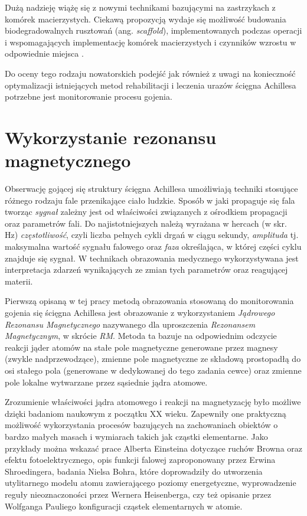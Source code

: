 Dużą nadzieję wiążę się z nowymi technikami bazującymi na zastrzykach z komórek macierzystych. Ciekawą propozycją wydaje się możliwość budowania biodegradowalnych rusztowań (ang. \textit{scaffold}), implementowanych podczas operacji i wspomagających implementację komórek macierzystych i czynników wzrostu w odpowiednie miejsca \cite{START}.

Do oceny tego rodzaju nowatorskich podejść jak również z uwagi na konieczność optymalizacji istniejących metod rehabilitacji i leczenia urazów ścięgna Achillesa potrzebne jest monitorowanie procesu gojenia. 

\section{Wykorzystanie rezonansu magnetycznego}
\label{RM}
Obserwację gojącej się struktury ścięgna Achillesa umożliwiają techniki stosujące różnego rodzaju fale przenikające ciało ludzkie. Sposób w jaki propaguje się fala tworząc \textit{sygnał} zależny jest od właściwości związanych z ośrodkiem propagacji oraz parametrów fali. Do najistotniejszych należą wyrażana w hercach (w skr. Hz) \textit{częstotliwość}, czyli liczba pełnych cykli drgań w ciągu sekundy, \textit{amplituda} tj. maksymalna wartość sygnału falowego oraz \textit{faza} określająca, w której części cyklu znajduje się sygnał. W technikach obrazowania medycznego wykorzystywana jest interpretacja zdarzeń wynikających ze zmian tych parametrów oraz reagującej materii.

Pierwszą opisaną w tej pracy metodą obrazowania stosowaną do monitorowania gojenia się ścięgna Achillesa jest obrazowanie z wykorzystaniem \textit{Jądrowego Rezonansu Magnetycznego} nazywanego dla uproszczenia \textit{Rezonansem Magnetycznym}, w skrócie \textit{RM}. Metoda ta bazuje na odpowiednim odczycie reakcji jąder atomów na stałe pole magnetyczne generowane przez magnesy (zwykle nadprzewodzące), zmienne pole magnetyczne ze składową prostopadłą do osi stałego pola (generowane w dedykowanej do tego zadania cewce) oraz zmienne pole lokalne wytwarzane przez sąsiednie jądra atomowe.

Zrozumienie właściwości jądra atomowego i reakcji na magnetyzację było możliwe dzięki badaniom naukowym z początku XX wieku. Zapewniły one praktyczną możliwość wykorzystania procesów bazujących na zachowaniach obiektów o bardzo małych masach i wymiarach takich jak cząstki elementarne. Jako przykłady można wskazać prace Alberta Einsteina dotyczące ruchów Browna oraz efektu fotoelektrycznego, opis funkcji falowej zaproponowany przez Erwina Shroedingera, badania Nielsa Bohra, które doprowadziły do utworzenia utylitarnego modelu atomu zawierającego poziomy energetyczne, wyprowadzenie reguły nieoznaczoności przez Wernera Heisenberga, czy też opisanie przez Wolfganga Pauliego konfiguracji cząstek elementarnych w atomie. 


